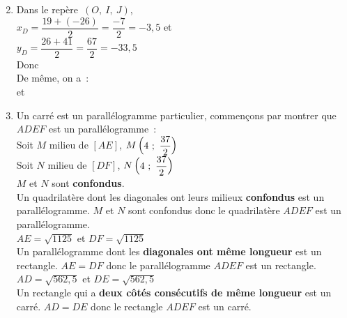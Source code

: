 \documentclass[a4paper,12pt,twocolumn,landscape]{article}
\newcommand{\rep}[3]{~$\left(#1,~#2,~#3\right)$}
\begin{document}
\newpage

\begin{minipage}{0.45\textwidth}
\thispagestyle{vide}

\vspace*{1em}


\begin{enumerate}
	\setcounter{enumi}{1}
	\item Dans le repère\rep{O}{I}{J},\\[1em]
			$x_D = \dfrac{19 + (-26)}{2} = \dfrac{-7}{2} = -3,5$ et\\
			$y_D = \dfrac{26 + 41}{2} = \dfrac{67}{2} = -33,5$\\[1em]
			Donc \\[1em]
			De même, on a~:\\[1em]  et 
	\item Un carré est un parallélogramme particulier, commençons par montrer que $ADEF$ est un parallélogramme~:\\
			Soit $M$ milieu de $[AE]$, $M\begin{pmatrix}4~;~\dfrac{37}{2}\end{pmatrix}$\\
			Soit $N$ milieu de $[DF]$, $N\begin{pmatrix}4~;~\dfrac{37}{2}\end{pmatrix}$\\
			$M$ et $N$ sont \textbf{confondus}.\\
			Un quadrilatère dont les diagonales ont leurs milieux \textbf{confondus} est un parallélogramme. $M$ et $N$ sont confondus donc le quadrilatère $ADEF$ est un parallélogramme.\\[1em]
			$AE = \sqrt{1125}$ et $DF = \sqrt{1125}$\\
			Un parallélogramme dont les \textbf{diagonales ont même longueur} est un rectangle. $AE = DF$ donc le parallélogramme $ADEF$ est un rectangle.\\[1em]
			$AD = \sqrt{562,5}$ et $DE = \sqrt{562,5}$\\			
			Un rectangle qui a \textbf{deux côtés consécutifs de même longueur} est un carré. $AD = DE$ donc le rectangle $ADEF$ est un carré.\\
			
			\\
\end{enumerate}

\end{minipage}

\newpage
\end{document}
